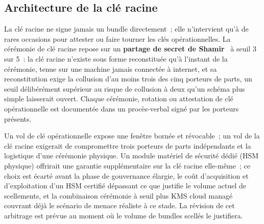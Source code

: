 \documentclass[11pt,a4paper]{article}
\begin{document}
\subsection{Architecture de la clé racine}\label{sec:racine}

\begin{center}
\end{center}

La clé racine ne signe jamais un bundle directement~; elle n'intervient qu'à de rares occasions pour attester ou faire tourner les clés opérationnelles. La cérémonie de clé racine repose sur un \textbf{partage de secret de Shamir}~\cite{shamir1979} à seuil 3 sur 5~: la clé racine n'existe sous forme reconstituée qu'à l'instant de la cérémonie, tenue sur une machine jamais connectée à internet, et sa reconstitution exige la collusion d'au moins trois des cinq porteurs de parts, un seuil délibérément supérieur au risque de collusion à deux qu'un schéma plus simple laisserait ouvert. Chaque cérémonie, rotation ou attestation de clé opérationnelle est documentée dans un procès-verbal signé par les porteurs présents.

Un vol de clé opérationnelle expose une fenêtre bornée et révocable~; un vol de la clé racine exigerait de compromettre trois porteurs de parts indépendants et la logistique d'une cérémonie physique. Un module matériel de sécurité dédié (HSM physique) offrirait une garantie supplémentaire sur la clé racine elle-même~; ce choix est écarté avant la phase de gouvernance élargie, le coût d'acquisition et d'exploitation d'un HSM certifié dépassant ce que justifie le volume actuel de scellements, et la combinaison cérémonie à seuil plus KMS cloud managé couvrant déjà le scénario de menace réaliste à ce stade. La révision de cet arbitrage est prévue au moment où le volume de bundles scellés le justifiera.
\end{document}
